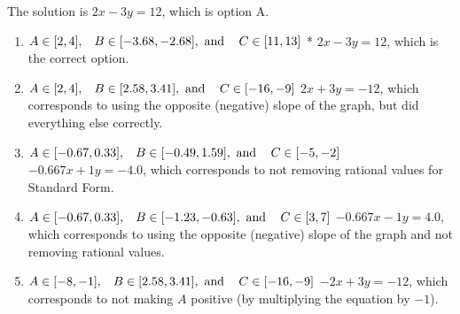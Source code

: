 \documentclass{extbook}[14pt]
\begin{document}
\begin{enumerate}
{The solution is \( 2x - 3y = 12 \), which is option A.\begin{enumerate}[label=\Alph*.]
\item \( A \in [2, 4], \hspace{3mm} B \in [-3.68, -2.68], \text{ and } \hspace{3mm} C \in [11, 13] \)
* $2x - 3y = 12$, which is the correct option.
\item \( A \in [2, 4], \hspace{3mm} B \in [2.58, 3.41], \text{ and } \hspace{3mm} C \in [-16, -9] \)
 $2x + 3y = -12$, which corresponds to using the opposite (negative) slope of the graph, but did everything else correctly.
\item \( A \in [-0.67, 0.33], \hspace{3mm} B \in [-0.49, 1.59], \text{ and } \hspace{3mm} C \in [-5, -2] \)
 $-0.667x + 1y = -4.0$, which corresponds to not removing rational values for Standard Form.
\item \( A \in [-0.67, 0.33], \hspace{3mm} B \in [-1.23, -0.63], \text{ and } \hspace{3mm} C \in [3, 7] \)
 $-0.667x - 1y = 4.0$, which corresponds to using the opposite (negative) slope of the graph and not removing rational values.
\item \( A \in [-8, -1], \hspace{3mm} B \in [2.58, 3.41], \text{ and } \hspace{3mm} C \in [-16, -9] \)
 $-2x + 3y = -12$, which corresponds to not making $A$ positive (by multiplying the equation by $-1$).
\end{enumerate}

}
\end{enumerate}
\end{document}
